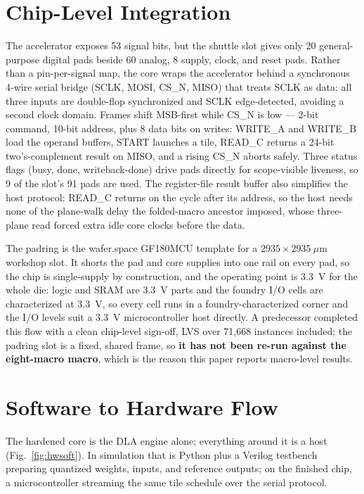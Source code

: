 \documentclass[conference,a4paper]{APSIPA2026}
\begin{document}
\section{Chip-Level Integration}\label{sec:chip}

The accelerator exposes 53 signal bits, but the shuttle slot gives only 20 general-purpose digital pads beside 60 analog, 8 supply, clock, and reset pads. Rather than a pin-per-signal map, the core wraps the accelerator behind a synchronous 4-wire serial bridge (SCLK, MOSI, CS\_N, MISO) that treats SCLK as data: all three inputs are double-flop synchronized and SCLK edge-detected, avoiding a second clock domain. Frames shift MSB-first while CS\_N is low --- 2-bit command, 10-bit address, plus 8 data bits on writes: WRITE\_A and WRITE\_B load the operand buffers, START launches a tile, READ\_C returns a 24-bit two's-complement result on MISO, and a rising CS\_N aborts safely. Three status flags (busy, done, writeback-done) drive pads directly for scope-visible liveness, so 9 of the slot's 91 pads are used. The register-file result buffer also simplifies the host protocol: READ\_C returns on the cycle after its address, so the host needs none of the plane-walk delay the folded-macro ancestor imposed, whose three-plane read forced extra idle core clocks before the data.

The padring is the wafer.space GF180MCU template \cite{padring} for a $2935\times2935~\mu$m workshop slot. It shorts the pad and core supplies into one rail on every pad, so the chip is single-supply by construction, and the operating point is 3.3~V for the whole die: logic and SRAM are 3.3~V parts and the foundry I/O cells are characterized at 3.3~V, so every cell runs in a foundry-characterized corner and the I/O levels suit a 3.3~V microcontroller host directly. A predecessor completed this flow with a clean chip-level sign-off, LVS over 71{,}668 instances included; the padring slot is a fixed, shared frame, so \textbf{it has not been re-run against the eight-macro macro}, which is the reason this paper reports macro-level results.

\section{Software to Hardware Flow}\label{sec:sw}

The hardened core is the DLA engine alone; everything around it is a host (Fig.~\ref{fig:hwsoft}). In simulation that is Python plus a Verilog testbench preparing quantized weights, inputs, and reference outputs; on the finished chip, a microcontroller streaming the same tile schedule over the serial protocol.
\end{document}

